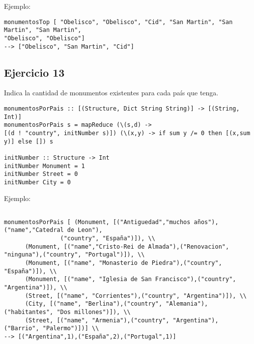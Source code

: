 \documentclass[10pt, a4paper,english,spanish,hidelinks]{article}
\begin{document}
Ejemplo:
\begin{verbatim}
monumentosTop [ "Obelisco", "Obelisco", "Cid", "San Martin", "San Martin", "San Martin", 
"Obelisco", "Obelisco"]
--> ["Obelisco", "San Martin", "Cid"]
\end{verbatim}


\subsection{Ejercicio 13}
Indica la cantidad de monumentos existentes para cada país que tenga.
\begin{verbatim}
monumentosPorPais :: [(Structure, Dict String String)] -> [(String, Int)]
monumentosPorPais s = mapReduce (\(s,d) -> 
[(d ! "country", initNumber s)]) (\(x,y) -> if sum y /= 0 then [(x,sum y)] else []) s

initNumber :: Structure -> Int
initNumber Monument = 1
initNumber Street = 0
initNumber City = 0
\end{verbatim}

Ejemplo:
\begin{verbatim}

monumentosPorPais [ (Monument, [("Antiguedad","muchos años"),("name","Catedral de Leon"),
				("country", "España")]), \\
	  (Monument, [("name","Cristo-Rei de Almada"),("Renovacion", "ninguna"),("country", "Portugal")]), \\
	  (Monument, [("name", "Monasterio de Piedra"),("country", "España")]), \\
	  (Monument, [("name", "Iglesia de San Francisco"),("country", "Argentina")]), \\
	  (Street, [("name", "Corrientes"),("country", "Argentina")]), \\
	  (City, [("name", "Berlina"),("country", "Alemania"),("habitantes", "Dos millones")]), \\
	  (Street, [("name", "Armenia"),("country", "Argentina"),("Barrio", "Palermo")])] \\
--> [("Argentina",1),("España",2),("Portugal",1)]

\end{verbatim}
\end{document}
